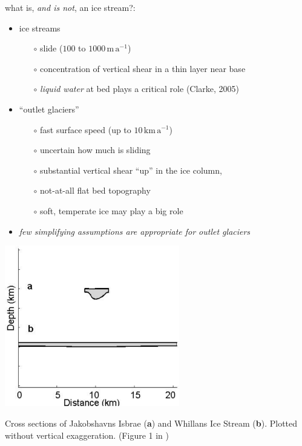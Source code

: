 \documentclass[titlepage,letterpaper,final,11pt]{scrartcl}
\newcommand{\alert}[1]{\emph{#1}}
\begin{document}
what is, \emph{and is not}, an ice stream?:

\begin{itemize}
\item ice streams 
  \begin{itemize}
  \item[$\circ$] slide ($100$ to $1000 \,\text{m}\,\text{a}^{-1}$)
  \item[$\circ$] concentration of vertical shear in a thin layer near base
  \item[$\circ$] \emph{liquid water} at bed plays a critical role (Clarke, 2005)\nocite{Clarke05}
  \end{itemize}
\item ``outlet glaciers''
  \begin{itemize}
  \item[$\circ$] fast surface speed (up to $10 \,\text{km}\,\text{a}^{-1}$)
  \item[$\circ$] uncertain how much is sliding
  \item[$\circ$] substantial vertical shear ``up'' in the ice column,
  \item[$\circ$] not-at-all flat bed topography
  \item[$\circ$] soft, temperate ice may play a big role
  \end{itemize} 
\item \alert{few simplifying assumptions are appropriate for outlet glaciers}
\end{itemize}

\begin{center}
\includegraphics[width=3.0in]{streamisbrae}

Cross sections of Jakobshavns Isbrae (\textbf{a}) and Whillans Ice Stream (\textbf{b}).  Plotted without vertical exaggeration.  (Figure 1 in \cite{TrufferEchelmeyer})
\end{center}
\end{document}
